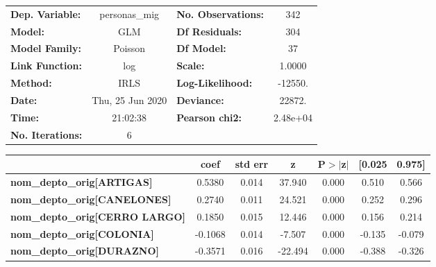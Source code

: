 \begin{center}
\begin{tabular}{lclc}
\toprule
\textbf{Dep. Variable:}                    &  personas\_mig   & \textbf{  No. Observations:  } &      342    \\
\textbf{Model:}                            &       GLM        & \textbf{  Df Residuals:      } &      304    \\
\textbf{Model Family:}                     &     Poisson      & \textbf{  Df Model:          } &       37    \\
\textbf{Link Function:}                    &       log        & \textbf{  Scale:             } &    1.0000   \\
\textbf{Method:}                           &       IRLS       & \textbf{  Log-Likelihood:    } &   -12550.   \\
\textbf{Date:}                             & Thu, 25 Jun 2020 & \textbf{  Deviance:          } &    22872.   \\
\textbf{Time:}                             &     21:02:38     & \textbf{  Pearson chi2:      } &  2.48e+04   \\
\textbf{No. Iterations:}                   &        6         & \textbf{                     } &             \\
\bottomrule
\end{tabular}
\begin{tabular}{lcccccc}
                                           & \textbf{coef} & \textbf{std err} & \textbf{z} & \textbf{P$> |$z$|$} & \textbf{[0.025} & \textbf{0.975]}  \\
\midrule
\textbf{nom\_depto\_orig[ARTIGAS]}         &       0.5380  &        0.014     &    37.940  &         0.000        &        0.510    &        0.566     \\
\textbf{nom\_depto\_orig[CANELONES]}       &       0.2740  &        0.011     &    24.521  &         0.000        &        0.252    &        0.296     \\
\textbf{nom\_depto\_orig[CERRO LARGO]}     &       0.1850  &        0.015     &    12.446  &         0.000        &        0.156    &        0.214     \\
\textbf{nom\_depto\_orig[COLONIA]}         &      -0.1068  &        0.014     &    -7.507  &         0.000        &       -0.135    &       -0.079     \\
\textbf{nom\_depto\_orig[DURAZNO]}         &      -0.3571  &        0.016     &   -22.494  &         0.000        &       -0.388    &       -0.326     \\

\end{tabular}
\end{center}
